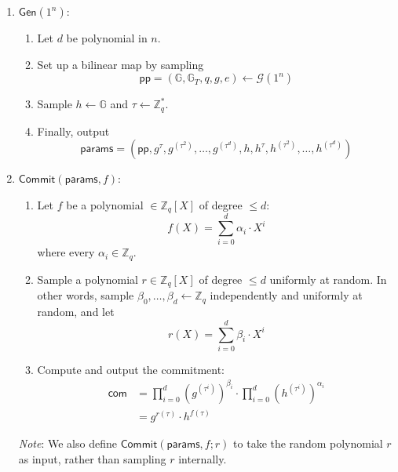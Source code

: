 \documentclass[11pt]{article}
\newcommand{\Gen}{\mathsf{Gen}}
\newcommand{\Commit}{\mathsf{Commit}}
\newcommand{\G}{\mathcal{G}}
\newcommand{\GG}{\mathbb{G}}
\newcommand{\pp}{\mathsf{pp}}
\newcommand{\ZZ}{\mathbb{Z}}
\numberwithin{equation}{section}
\begin{document}
\begin{enumerate}
    \item $\Gen(1^n)$: \begin{enumerate}
        \item Let $d$ be polynomial in $n$.
        \item Set up a bilinear map by sampling 
        \[\pp = (\GG, \GG_T, q, g, e) \leftarrow \G(1^n)\]
        \item Sample $h \leftarrow \GG$ and $\tau \leftarrow \ZZ_q^*$.
        \item Finally, output
        \[\mathsf{params} = \left(\pp, g^{\tau}, g^{(\tau^2)}, \dots, g^{(\tau^{d})}, h, h^{\tau}, h^{(\tau^2)}, \dots, h^{(\tau^{d})}\right)\]
    \end{enumerate}
    \item $\Commit(\mathsf{params}, f)$:
    \begin{enumerate}
        \item Let $f$ be a polynomial $\in \ZZ_q[X]$ of degree $\leq d$:
        \[f(X) = \sum_{i = 0}^{d} \alpha_i \cdot X^i\]
        where every $\alpha_i \in \ZZ_q$.
        \item Sample a polynomial $r \in \ZZ_q[X]$ of degree $\leq d$ uniformly at random. In other words, sample $\beta_0, \dots, \beta_d \leftarrow \ZZ_q$ independently and uniformly at random, and let 
        \[r(X) = \sum_{i = 0}^d \beta_i \cdot X^i\]
        \item Compute and output the commitment:
        \begin{align*}
            \mathsf{com} &= \prod_{i = 0}^{d} \left(g^{(\tau^i)}\right)^{\beta_i} \cdot \prod_{i = 0}^{d} \left(h^{(\tau^i)}\right)^{\alpha_i}\\
            &= g^{r(\tau)} \cdot h^{f(\tau)}
        \end{align*}
    \end{enumerate}

\emph{Note}: We also define $\Commit(\mathsf{params}, f; r)$ to take the random polynomial $r$ as input, rather than sampling $r$ internally.
\end{enumerate}
\pagebreak
\end{document}
